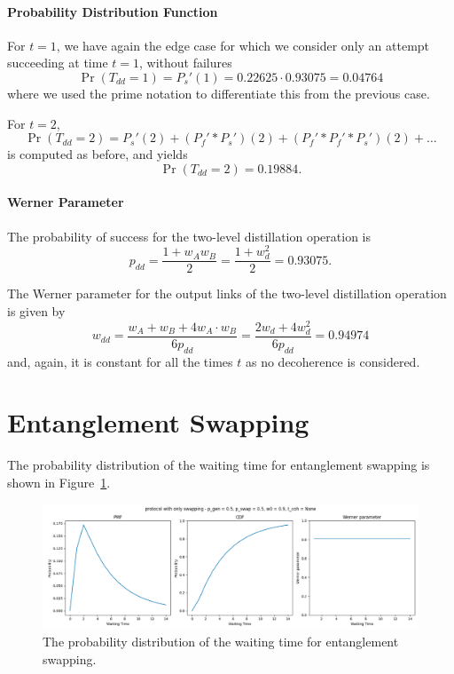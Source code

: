 \documentclass{masterthesis}
\begin{document}
\paragraph*{Probability Distribution Function}

For $t = 1$, we have again the edge case for which we consider only an attempt succeeding at time $t=1$, without failures  
\begin{equation}
    \Pr(T_{dd} = 1) = P_s'(1) = 0.22625 \cdot 0.93075 = 0.04764 
\end{equation}
where we used the prime notation to differentiate this from the previous case. 

For $t = 2$,
\begin{equation}
    \Pr(T_{dd} = 2) = P_s'(2) + (P_f' \ast P_s')(2) + (P_f' \ast P_f' \ast P_s')(2) + \ldots
\end{equation}
is computed as before, and yields
\begin{equation}
    \Pr(T_{dd} = 2) = 0.19884 .
\end{equation}

\paragraph*{Werner Parameter}

The probability of success for the two-level distillation operation is
\begin{equation}
    p_{dd} = \frac{1 + w_A w_B}{2} = \frac{1 + w_d^2}{2} = 0.93075 .
\end{equation}

The Werner parameter for the output links of the two-level distillation operation is given by
\begin{equation}
    w_{dd} = \frac{w_A + w_B + 4 w_A \cdot w_B}{6 p_{dd}} = \frac{2 w_d + 4 w_d^2}{6 p_{dd}} = 0.94974
\end{equation}
and, again, it is constant for all the times $t$ as no decoherence is considered.

\section{Entanglement Swapping}\label{section:entanglement_swapping_numerical_example}

The probability distribution of the waiting time for entanglement swapping is shown in Figure~\ref{fig:swap_waiting_time}.
\begin{figure}[ht]
    \centering
    \includegraphics[width=1\linewidth]{images/dist_tests/only swapping.png}
    \caption{The probability distribution of the waiting time for entanglement swapping.}
    \label{fig:swap_waiting_time}
\end{figure}
\end{document}
